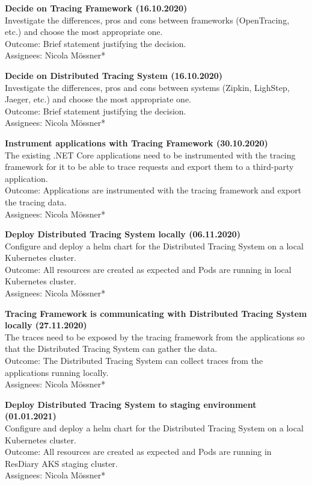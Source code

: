 \documentclass[11pt]{article}
\begin{document}
\textbf{Decide on Tracing Framework (16.10.2020)}\\
Investigate the differences, pros and cons between frameworks (OpenTracing, etc.) and choose the most appropriate one.\\
Outcome: Brief statement justifying the decision.\\
Assignees: Nicola M\"{o}ssner*

\textbf{Decide on Distributed Tracing System (16.10.2020)}\\
Investigate the differences, pros and cons between systems (Zipkin, LighStep, Jaeger, etc.) and choose the most appropriate one.\\
Outcome: Brief statement justifying the decision.\\
Assignees: Nicola M\"{o}ssner*

\textbf{Instrument applications with Tracing Framework (30.10.2020)}\\
The existing .NET Core applications need to be instrumented with the tracing framework for it to be able to trace requests and export them to a third-party application.\\
Outcome: Applications are instrumented with the tracing framework and export the tracing data.\\
Assignees: Nicola M\"{o}ssner*

\textbf{Deploy Distributed Tracing System locally (06.11.2020)}\\
Configure and deploy a helm chart for the Distributed Tracing System on a local Kubernetes cluster.\\
Outcome: All resources are created as expected and Pods are running in local Kubernetes cluster.\\
Assignees: Nicola M\"{o}ssner*

\textbf{Tracing Framework is communicating with Distributed Tracing System locally (27.11.2020)}\\
The traces need to be exposed by the tracing framework from the applications so that the Distributed Tracing System can gather the data.\\
Outcome: The Distributed Tracing System can collect traces from the applications running locally.\\
Assignees: Nicola M\"{o}ssner*

\textbf{Deploy Distributed Tracing System to staging environment (01.01.2021)}\\
Configure and deploy a helm chart for the Distributed Tracing System on a local Kubernetes cluster.\\
Outcome: All resources are created as expected and Pods are running in ResDiary AKS staging cluster.\\
Assignees: Nicola M\"{o}ssner*
\end{document}
